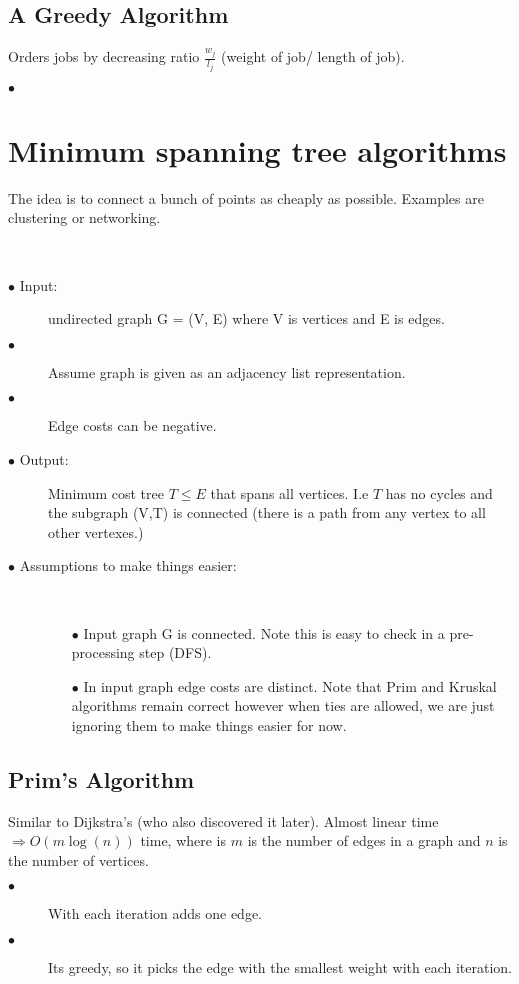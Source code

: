 \documentclass{article}
\begin{document}
\subsection{A Greedy Algorithm}
Orders jobs by decreasing ratio $\frac {w_j}{l_j}$ (weight of job/
length of job).
\begin{description}
  \item[$\bullet$]{}
\end{description}

\section{Minimum spanning tree algorithms}
The idea is to connect a bunch of points as cheaply as possible.
Examples are clustering or networking.

\
\begin{description}
\item[$\bullet$ Input: ]{undirected graph G = (V, E) where V is vertices and E is edges.}
\item[$\bullet$ ]{Assume graph is given as an adjacency list representation.}
\item[$\bullet$ ]{Edge costs can be negative.}
\item[$\bullet$ Output: ]{Minimum cost tree $T \leq E$ that spans all vertices. I.e $T$ has no cycles and the subgraph (V,T) is connected (there is a path from any vertex to all other vertexes.)}
\item[$\bullet$ Assumptions to make things easier:]{
\
\begin{itemize}
\item[$\bullet$]{Input graph G is connected. Note this is easy to check in a pre-processing step (DFS).}
\item[$\bullet$]{In input graph edge costs are distinct. Note that Prim and Kruskal algorithms remain correct however when ties are allowed, we are just ignoring them to make things easier for now.}
\end{itemize}}
\end{description}

\subsection{Prim's Algorithm}
Similar to Dijkstra's (who also discovered it later).
Almost linear time $\Rightarrow O(m\log(n))$ time, where is $m$ is the
number of edges in a graph and $n$ is the number of vertices.
\
\begin{description}
\item[$\bullet$]{With each iteration adds one edge.}
\item[$\bullet$]{Its greedy, so it picks the edge with the smallest weight with each iteration.}
\end{description}
\end{document}
